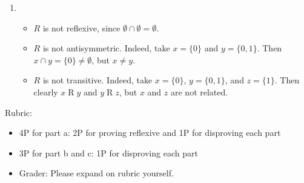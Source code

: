 \documentclass{article}
\theoremstyle{definition}
\begin{document}
\begin{solution}
\begin{enumerate}
	\item 
	\begin{itemize}
		\item $ R$ is not reflexive, since $\emptyset \cap \emptyset = \emptyset$.
		\item $ R$ is not antisymmetric. Indeed, take $x = \{ 0 \}$ and $y = \{0,1\}$. Then $x \cap y = \{0 \} \neq \emptyset$, but $x \neq y$.
		\item $ R$ is not transitive. Indeed, take $x = \{ 0 \}$, $y = \{0,1\}$, and $z = \{1\}$. Then clearly $x \mathrel{R}y$ and $y \mathrel{R}z$, but $x$ and $z$ are not related.
	\end{itemize}
     \end{enumerate}
 {\color{red} Rubric:
\begin{itemize}
\item 4P for part a: 2P for proving reflexive and 1P for disproving each part
\item 3P for part b and c: 1P for disproving each part
\item Grader: Please expand on rubric yourself.
\end{itemize}}
\end{solution}
\end{document}
